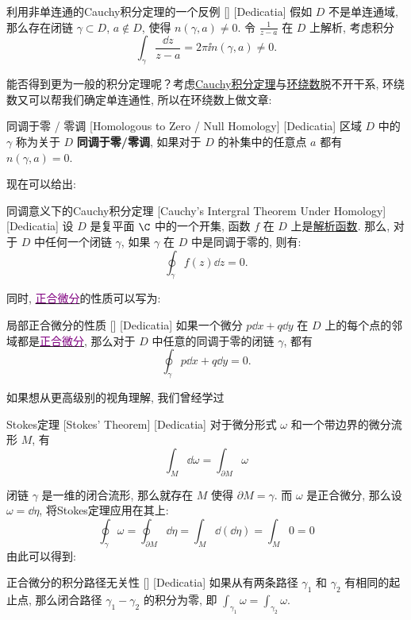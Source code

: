 \documentclass[UTF8]{ctexart}
\newcommand{\hyperrefc}[2]{\hyperref[#1]{\textcolor{purple}{#2}}}
\newcommand{\AnalyticalFunction}{\hyperref[dfn:AnalyticalFunction]{解析函数}}
\newcommand{\CauchyThm}{\hyperref[thm:Cauchy]{Cauchy积分定理}}
\begin{document}
\begin{cxmp}
    [UUID]
    {利用非单连通的Cauchy积分定理的一个反例}
    []
    [Dedicatia]
    假如 \( D \) 不是单连通域, 那么存在闭链 \( \gamma\subset D \),  \( a\notin D \), 使得 \( n(\gamma,a)\neq 0 \). 令 \( \frac{1}{z-a} \) 在 \( D \) 上解析, 考虑积分
    \[\int_\gamma\frac{\dd{z}}{z-a}=2\pi\ii n(\gamma,a)\neq 0.\]
\end{cxmp}
能否得到更为一般的积分定理呢？考虑\CauchyThm 与\hyperref[dfn:WindingNumber]{环绕数}脱不开干系, 环绕数又可以帮我们确定单连通性, 所以在环绕数上做文章: 
\begin{dfn}
    [NullHomologous]
    {同调于零 / 零调}
    [Homologous to Zero / Null Homology]
    [Dedicatia]
    区域 \( D \) 中的 \( \gamma \) 称为关于 \( D \) \textbf{同调于零/零调}, 如果对于 \( D \) 的补集中的任意点 \( a \) 都有 \( n(\gamma,a)=0 \).
\end{dfn}
现在可以给出: 
\begin{thm}
    [UUID]
    {同调意义下的Cauchy积分定理}
    [Cauchy's Intergral Theorem Under Homology]
    [Dedicatia]
    设 \(D\) 是复平面 \(\C\) 中的一个开集, 函数 \(f\) 在 \(D\) 上是\AnalyticalFunction. 那么, 对于 \( D \) 中任何一个闭链 \( \gamma \), 如果 \( \gamma \) 在 \( D \) 中是同调于零的, 则有: 
    \[\oint_{\gamma} f(z) \dd z = 0.\]
\end{thm}
同时, \hyperrefc{dfn:ExactDifferential}{正合微分}的性质可以写为: 
\begin{ppt}
    [UUID]
    {局部正合微分的性质}
    []
    [Dedicatia]
    如果一个微分 \( p\dd{x}+q\dd{y} \) 在 \( D \) 上的每个点的邻域都是\hyperrefc{dfn:ExactDifferential}{正合微分}, 那么对于 \( D \) 中任意的同调于零的闭链 \( \gamma \), 都有
    \[\oint_\gamma p\dd{x}+q\dd{y}=0.\]
\end{ppt}
如果想从更高级别的视角理解, 我们曾经学过
\begin{thm}
    [UUID]
    {Stokes定理}
    [Stokes' Theorem]
    [Dedicatia]
    对于微分形式 \( \omega \) 和一个带边界的微分流形 \( M \), 有
    \[\int_{M} \dd\omega = \int_{\partial M} \omega\]
\end{thm}
闭链 \( \gamma \) 是一维的闭合流形, 那么就存在 \( M \) 使得 \( \partial M=\gamma \). 而 \( \omega \) 是正合微分, 那么设 \( \omega=\dd{\eta} \), 将Stokes定理应用在其上: 
\[\oint_{\gamma} \omega = \oint_{\partial M} \dd\eta = \int_{M} \dd(\dd\eta) = \int_{M} 0 = 0\]
由此可以得到: 
\begin{ppt}
    [UUID]
    {正合微分的积分路径无关性}
    []
    [Dedicatia]
    如果从有两条路径  \( \gamma_1 \)  和  \( \gamma_2 \) 有相同的起止点, 那么闭合路径  \( \gamma_1 - \gamma_2 \)  的积分为零, 即  \( \int_{\gamma_1} \omega = \int_{\gamma_2} \omega \). 
\end{ppt}
\end{document}
